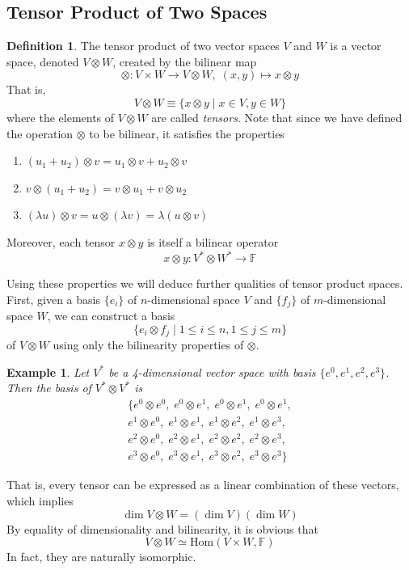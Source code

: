 \documentclass{article}
\newtheorem{example}{Example}[section]
\theoremstyle{remark}
\theoremstyle{definition}
\newtheorem{definition}{Definition}[section]
\begin{document}
\subsection{Tensor Product of Two Spaces}
\begin{definition}
The tensor product of two vector spaces $V$ and $W$ is a vector space, denoted $V \otimes W$, created by the bilinear map 
\[\otimes: V \times W \longrightarrow V \otimes W, \; (x, y) \mapsto x \otimes y\]
That is, 
\[V \otimes W \equiv \{ x \otimes y \; | \; x \in V, y \in W\} \]
where the elements of $V \otimes W$ are called \textit{tensors}. Note that since we have defined the operation $\otimes$ to be bilinear, it satisfies the properties
\begin{enumerate}
    \item $(u_1 + u_2) \otimes v = u_1 \otimes v + u_2 \otimes v$
    \item $v \otimes (u_1 + u_2) = v \otimes u_1 + v \otimes u_2$
    \item $(\lambda u) \otimes v = u \otimes (\lambda v) = \lambda (u \otimes v)$ 
\end{enumerate}
Moreover, each tensor $x \otimes y$ is itself a bilinear operator
\[x \otimes y: V^* \otimes W^* \longrightarrow \mathbb{F}\]
\end{definition}

Using these properties we will deduce further qualities of tensor product spaces. First, given a basis $\{e_i\}$ of $n$-dimensional space $V$ and $\{f_j\}$ of $m$-dimensional space $W$, we can construct a basis 
\[\{e_i \otimes f_j \; | \; 1 \leq i \leq n, 1 \leq j \leq m\}\]
of $V \otimes W$ using only the bilinearity properties of $\otimes$. 

\begin{example}
Let $V^*$ be a 4-dimensional vector space with basis $\{ e^0, e^1, e^2, e^3\}$. Then the basis of $V^* \otimes V^*$ is
\begin{align*} 
\{e^0 \otimes e^0, \; e^0 \otimes e^1, \;e^0 \otimes e^1, \;e^0 \otimes e^1, \\
e^1 \otimes e^0,\; e^1 \otimes e^1,\; e^1 \otimes e^2,\; e^1 \otimes e^3, \\
e^2 \otimes e^0,\; e^2 \otimes e^1,\; e^2 \otimes e^2,\; e^2 \otimes e^3, \\
e^3 \otimes e^0,\; e^3 \otimes e^1,\; e^3 \otimes e^2,\; e^3 \otimes e^3\}
\end{align*}
\end{example}

That is, every tensor can be expressed as a linear combination of these vectors, which implies
\[\dim{V \otimes W} = (\dim{V}) (\dim{W})\]
By equality of dimensionality and bilinearity, it is obvious that
\[V \otimes W \simeq \text{Hom}(V \times W, \mathbb{F})\]
In fact, they are naturally isomorphic. 
\\
\end{document}
